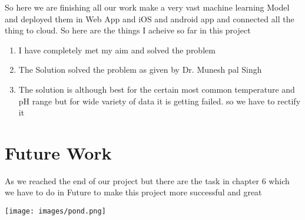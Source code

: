 So here we are finishing all our work make a very vast machine learning Model and deployed them in Web App and iOS and android app and connected all the thing to cloud. So here are the things I acheive so far in this project

\begin{enumerate}
\item	I have completely met my aim and solved the problem
\item	 The Solution solved the problem as given by Dr. Munesh pal Singh
\item	The solution is although best for the certain most common temperature and pH range but for wide variety of data it is getting failed. so we have to rectify it
\end{enumerate}


\section{Future Work}
As we reached the end of our project but there are the task in chapter 6 which we have to do in Future to make this project more successful and great

\texttt{[image: images/pond.png]}\\

